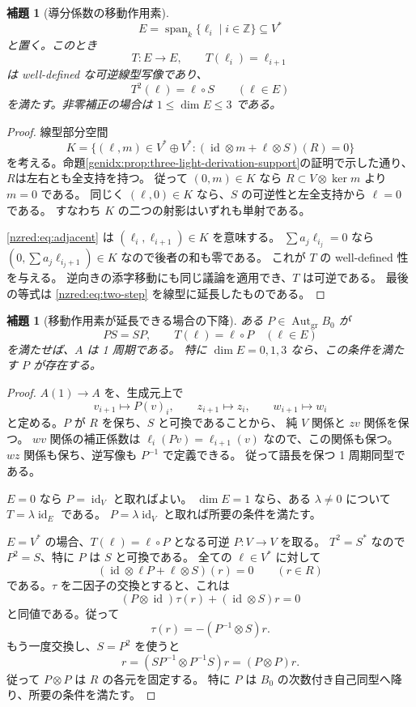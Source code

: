 \documentclass[11pt,a4paper]{ltjsarticle}
\newtheorem{lemma}[theorem]{補題}
\theoremstyle{definition}
\begin{document}
\begin{lemma}[導分係数の移動作用素]\label{n3desc:lem:shift-operator}
\[
E=\operatorname{span}_k\{\ell_i\mid i\in\mathbb Z\}\subseteq V^*
\]
と置く。このとき
\[
T:E\longrightarrow E,\qquad T(\ell_i)=\ell_{i+1}
\]
は well-defined な可逆線型写像であり、
\[
T^2(\ell)=\ell\circ S\qquad(\ell\in E)
\]
を満たす。非零補正の場合は $1\leq\dim E\leq3$ である。
\end{lemma}
\begin{proof}
線型部分空間
\[
K=\{(\ell,m)\in V^*\oplus V^*:
(\operatorname{id}\otimes m+\ell\otimes S)(R)=0\}
\]
を考える。命題\ref{genidx:prop:three-light-derivation-support}の証明で示した通り、
$R$は左右とも全支持を持つ。
従って $(0,m)\in K$ なら
$R\subset V\otimes\ker m$ より $m=0$ である。
同じく $(\ell,0)\in K$ なら、$S$ の可逆性と左全支持から $\ell=0$ である。
すなわち $K$ の二つの射影はいずれも単射である。

\eqref{nzred:eq:adjacent} は $(\ell_i,\ell_{i+1})\in K$ を意味する。
$\sum a_j\ell_{i_j}=0$ なら
$(0,\sum a_j\ell_{i_j+1})\in K$ なので後者の和も零である。
これが $T$ の well-defined 性を与える。
逆向きの添字移動にも同じ議論を適用でき、$T$ は可逆である。
最後の等式は \eqref{nzred:eq:two-step} を線型に延長したものである。
\end{proof}

\begin{lemma}[移動作用素が延長できる場合の下降]\label{n3desc:lem:extension-descent}
ある $P\in\operatorname{Aut}_{\mathrm{gr}}B_0$ が
\[
PS=SP,\qquad T(\ell)=\ell\circ P\quad(\ell\in E)
\]
を満たせば、$A$ は 1 周期である。
特に $\dim E=0,1,3$ なら、この条件を満たす $P$ が存在する。
\end{lemma}
\begin{proof}
$A(1)\to A$ を、生成元上で
\[
v_{i+1}\longmapsto P(v)_i,\qquad
z_{i+1}\longmapsto z_i,\qquad
w_{i+1}\longmapsto w_i
\]
と定める。$P$ が $R$ を保ち、$S$ と可換であることから、
純 $V$ 関係と $zv$ 関係を保つ。
$wv$ 関係の補正係数は
$\ell_i(Pv)=\ell_{i+1}(v)$ なので、この関係も保つ。
$wz$ 関係も保ち、逆写像も $P^{-1}$ で定義できる。
従って語長を保つ 1 周期同型である。

$E=0$ なら $P=\operatorname{id}_V$ と取ればよい。
$\dim E=1$ なら、ある $\lambda\ne0$ について $T=\lambda\operatorname{id}_E$ である。
$P=\lambda\operatorname{id}_V$ と取れば所要の条件を満たす。

$E=V^*$ の場合、$T(\ell)=\ell\circ P$ となる可逆 $P:V\to V$ を取る。
$T^2=S^*$ なので $P^2=S$、特に $P$ は $S$ と可換である。
全ての $\ell\in V^*$ に対して
\[
(\operatorname{id}\otimes\ell P+\ell\otimes S)(r)=0
\qquad(r\in R)
\]
である。$\tau$ を二因子の交換とすると、これは
\[
(P\otimes\operatorname{id})\tau(r)
+(\operatorname{id}\otimes S)r=0
\]
と同値である。従って
\[
\tau(r)=-(P^{-1}\otimes S)r.
\]
もう一度交換し、$S=P^2$ を使うと
\[
r=(SP^{-1}\otimes P^{-1}S)r=(P\otimes P)r.
\]
従って $P\otimes P$ は $R$ の各元を固定する。
特に $P$ は $B_0$ の次数付き自己同型へ降り、所要の条件を満たす。
\end{proof}
\end{document}
